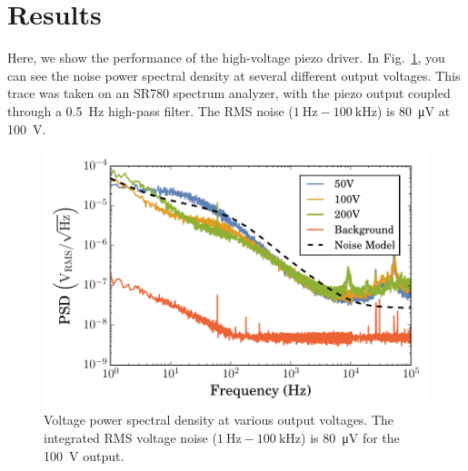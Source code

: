 \documentclass[aip,rsi,preprint,graphicx]{revtex4-1} %
\begin{document}
\section{Results}
\label{Sec:Results}
Here, we show the performance of the high-voltage piezo driver.
In Fig.~\ref{Fig:PSD}, you can see the noise power spectral density at several different output voltages.
This trace was taken on an SR780 spectrum analyzer, with the piezo output coupled through a \SI{0.5}{\hertz} high-pass filter. 
The RMS noise ($\SI{1}{\hertz} - \SI{100}{\kilo\hertz}$) is \SI{80}{\micro\volt} at \SI{100}{\volt}.
\begin{figure}[h]
\includegraphics[width=\columnwidth]{fig/VoltagePSD.pdf}
\caption{Voltage power spectral density at various output voltages. The integrated RMS voltage noise ($\SI{1}{\hertz} - \SI{100}{\kilo\hertz}$) is \SI{80}{\micro\volt} for the \SI{100}{\volt} output.\label{Fig:PSD}}
\end{figure}
\end{document}
